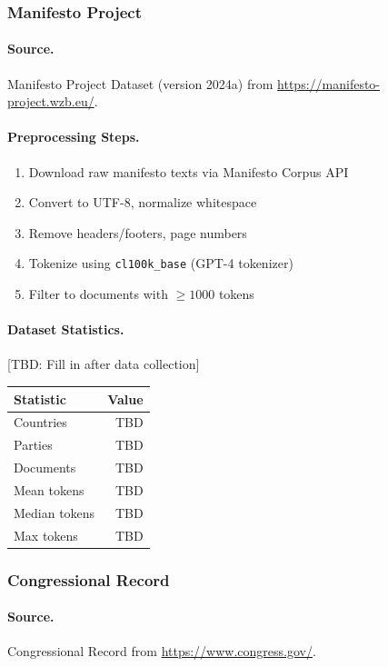 \subsubsection{Manifesto Project}

\paragraph{Source.}
Manifesto Project Dataset (version 2024a) from \url{https://manifesto-project.wzb.eu/}.

\paragraph{Preprocessing Steps.}
\begin{enumerate}[nosep]
    \item Download raw manifesto texts via Manifesto Corpus API
    \item Convert to UTF-8, normalize whitespace
    \item Remove headers/footers, page numbers
    \item Tokenize using \texttt{cl100k\_base} (GPT-4 tokenizer)
    \item Filter to documents with $\ge 1000$ tokens
\end{enumerate}

\paragraph{Dataset Statistics.}
[TBD: Fill in after data collection]
\begin{center}
\begin{tabular}{lr}
\toprule
Statistic & Value \\
\midrule
Countries & TBD \\
Parties & TBD \\
Documents & TBD \\
Mean tokens & TBD \\
Median tokens & TBD \\
Max tokens & TBD \\
\bottomrule
\end{tabular}
\end{center}

\subsubsection{Congressional Record}

\paragraph{Source.}
Congressional Record from \url{https://www.congress.gov/}.

